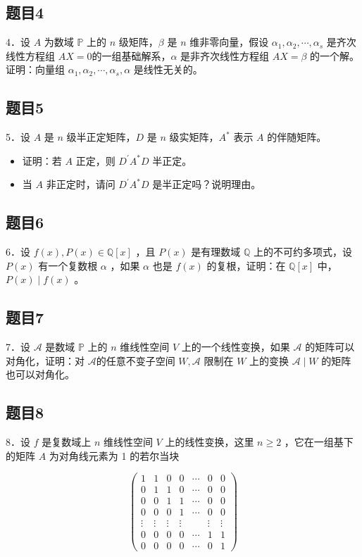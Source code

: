 \documentclass{article}
\begin{document}
\subsection{题目4}
4．设 \(A\) 为数域 \(\mathbb{P}\) 上的 \(n\) 级矩阵，\(\beta\) 是 \(n\) 维非零向量，假设 \(\alpha_{1}, \alpha_{2}, \cdots, \alpha_{s}\) 是齐次线性方程组 \(A X=0\)的一组基础解系，\(\alpha\) 是非齐次线性方程组 \(A X=\beta\) 的一个解。证明：向量组 \(\alpha_{1}, \alpha_{2}, \cdots, \alpha_{s}, \alpha\) 是线性无关的。

\subsection{题目5}
5．设 \(A\) 是 \(n\) 级半正定矩阵，\(D\) 是 \(n\) 级实矩阵，\(A^{*}\) 表示 \(A\) 的伴随矩阵。

\begin{itemize}
  \item[（1）] 证明：若 \(A\) 正定，则 \(D^{\prime} A^{*} D\) 半正定。
  \item[（2）] 当 \(A\) 非正定时，请问 \(D^{\prime} A^{*} D\) 是半正定吗？说明理由。
\end{itemize}

\subsection{题目6}
6．设 \(f(x), P(x) \in \mathbb{Q}[x]\) ，且 \(P(x)\) 是有理数域 \(\mathbb{Q}\) 上的不可约多项式，设 \(P(x)\) 有一个复数根 \(\alpha\) ，如果 \(\alpha\) 也是 \(f(x)\) 的复根，证明：在 \(\mathbb{Q}[x]\) 中，\(P(x) \mid f(x)\) 。

\subsection{题目7}
7．设 \(\mathcal{A}\) 是数域 \(\mathbb{P}\) 上的 \(n\) 维线性空间 \(V\) 上的一个线性变换，如果 \(\mathcal{A}\) 的矩阵可以对角化，证明：对 \(\mathcal{A}\)的任意不变子空间 \(W, \mathcal{A}\) 限制在 \(W\) 上的变换 \(\mathcal{A} \mid W\) 的矩阵也可以对角化。

\subsection{题目8}
8．设 \(f\) 是复数域上 \(n\) 维线性空间 \(V\) 上的线性变换，这里 \(n \geq 2\) ，它在一组基下的矩阵 \(A\) 为对角线元素为 1 的若尔当块

\[
\left(\begin{array}{ccccccc}
1 & 1 & 0 & 0 & \cdots & 0 & 0 \\
0 & 1 & 1 & 0 & \cdots & 0 & 0 \\
0 & 0 & 1 & 1 & \cdots & 0 & 0 \\
0 & 0 & 0 & 1 & \cdots & 0 & 0 \\
\vdots & \vdots & \vdots & \vdots & & \vdots & \vdots \\
0 & 0 & 0 & 0 & \cdots & 1 & 1 \\
0 & 0 & 0 & 0 & \cdots & 0 & 1
\end{array}\right)
\]
\end{document}
